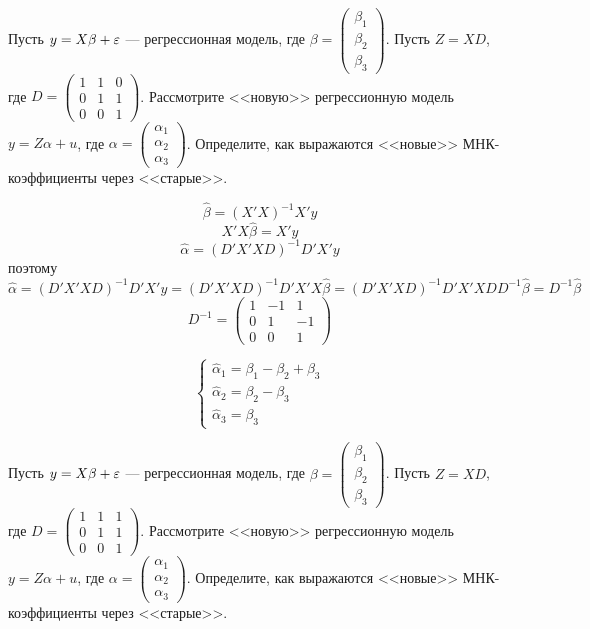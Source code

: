 \begin{problem} 
Пусть $y = X\beta + \varepsilon$ --- регрессионная модель, где $\beta = \begin{pmatrix} \beta_1 \\ \beta_2 \\ \beta_3 \end{pmatrix}$. Пусть $Z = XD$, где $D = \begin{pmatrix} 1 & 1 & 0 \\ 0 & 1 & 1 \\ 0 & 0 & 1 \end{pmatrix}$. Рассмотрите <<новую>> регрессионную модель $y = Z\alpha + u$, где $\alpha = \begin{pmatrix} \alpha_1 \\ \alpha_2 \\ \alpha_3 \end{pmatrix}$. Определите, как выражаются <<новые>> МНК-коэффициенты через <<старые>>.

\end{problem}

\begin{solution}
\[\hat\beta=(X'X)^{-1}X'y\]
\[X'X\hat\beta=X'y\]
\[\hat\alpha=(D'X'XD)^{-1}D'X'y\]
поэтому
\[\hat\alpha=(D'X'XD)^{-1}D'X'y=(D'X'XD)^{-1}D'X'X\hat\beta=(D'X'XD)^{-1}D'X'XDD^{-1}\hat\beta=D^{-1}\hat\beta\]
\[D^{-1}=\left(\begin{array}{ccc}
1 & -1 & 1\\ 
0 & 1 & -1\\
0 & 0 & 1
\end{array}\right)\]

\[\begin{cases}
\hat\alpha_1=\beta_1-\beta_2+\beta_3\\
\hat\alpha_2=\beta_2-\beta_3\\
\hat\alpha_3=\beta_3
\end{cases}\]
\end{solution}


\begin{problem}
Пусть $y = X\beta + \varepsilon$ --- регрессионная модель, где $\beta = \begin{pmatrix} \beta_1 \\ \beta_2 \\ \beta_3 \end{pmatrix}$. Пусть $Z = XD$, где $D = \begin{pmatrix} 1 & 1 & 1 \\ 0 & 1 & 1 \\ 0 & 0 & 1 \end{pmatrix}$. Рассмотрите <<новую>> регрессионную модель $y = Z\alpha + u$, где $\alpha = \begin{pmatrix} \alpha_1 \\ \alpha_2 \\ \alpha_3 \end{pmatrix}$. Определите, как выражаются <<новые>> МНК-коэффициенты через <<старые>>.

\end{problem}


